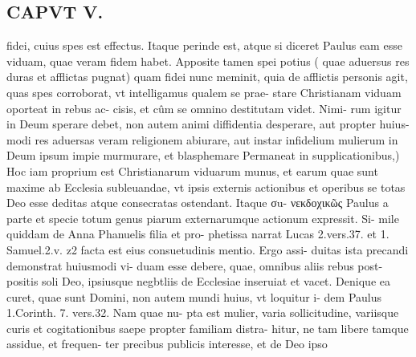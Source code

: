 \documentclass{article}
\begin{document}
\begin{pages}
\section*{CAPVT  V. }
\marginpar{[ p.29 ]}\pstart fidei, cuius spes est effectus. Itaque perinde est, atque si diceret Paulus eam esse viduam, quae veram fidem habet. Apposite tamen spei potius ( quae aduersus res duras et afflictas pugnat) quam fidei nunc meminit, quia de afflictis personis agit, quas spes corroborat, vt intelligamus qualem se prae- stare Christianam viduam oporteat in rebus ac- cisis, et cûm se omnino destitutam videt. Nimi- rum igitur in Deum sperare debet, non autem animi diffidentia desperare, aut propter huius- modi res aduersas veram religionem abiurare, aut instar infidelium mulierum in Deum ipsum impie murmurare, et blasphemare Permaneat in supplicationibus,) Hoc iam proprium est Christianarum viduarum munus, et earum quae sunt maxime ab Ecclesia subleuandae, vt ipsis externis actionibus et operibus se totas Deo esse deditas atque consecratas ostendant. Itaque σu- νεκδοχικῶς Paulus a parte et specie totum genus piarum externarumque actionum expressit. Si- mile quiddam de Anna Phanuelis filia et pro- phetissa narrat Lucas 2.vers.37. et 1. Samuel.2.v. z2 facta est eius consuetudinis mentio. Ergo assi- duitas ista precandi demonstrat huiusmodi vi- duam esse debere, quae, omnibus aliis rebus post- positis soli Deo, ipsiusque negbtliis de Ecclesiae inseruiat et vacet. Denique ea curet, quae sunt Domini, non autem mundi huius, vt loquitur i- dem Paulus 1.Corinth. 7. vers.32. Nam quae nu- pta est mulier, varia sollicitudine, variisque curis et cogitationibus saepe propter familiam distra- hitur, ne tam libere tamque assidue, et frequen- ter precibus publicis interesse, et de Deo ipso  \pend

\end{pages}
\end{document}
